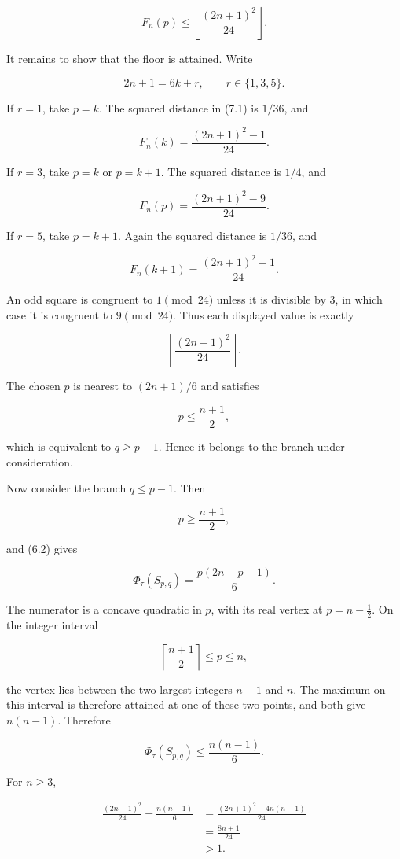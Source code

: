 \documentclass[
  american,
  11pt,
  a4paper,
]{article}
\begin{document}
\[
F_n(p)
\le
\left\lfloor\frac{(2n+1)^2}{24}\right\rfloor.
\]

It remains to show that the floor is attained. Write

\[
2n+1=6k+r,
\qquad
r\in\{1,3,5\}.
\]

If \(r=1\), take \(p=k\). The squared distance in (7.1) is \(1/36\), and

\[
F_n(k)
=
\frac{(2n+1)^2-1}{24}.
\]

If \(r=3\), take \(p=k\) or \(p=k+1\). The squared distance is \(1/4\), and

\[
F_n(p)
=
\frac{(2n+1)^2-9}{24}.
\]

If \(r=5\), take \(p=k+1\). Again the squared distance is \(1/36\), and

\[
F_n(k+1)
=
\frac{(2n+1)^2-1}{24}.
\]

An odd square is congruent to \(1\pmod{24}\) unless it is divisible by \(3\), in which case it is congruent to \(9\pmod{24}\). Thus each displayed value is exactly

\[
\left\lfloor\frac{(2n+1)^2}{24}\right\rfloor.
\]

The chosen \(p\) is nearest to \((2n+1)/6\) and satisfies

\[
p\le\frac{n+1}{2},
\]

which is equivalent to \(q\ge p-1\). Hence it belongs to the branch under consideration.

Now consider the branch \(q\le p-1\). Then

\[
p\ge\frac{n+1}{2},
\]

and (6.2) gives

\[
\Phi_\tau(S_{p,q})
=
\frac{p(2n-p-1)}6.
\]

The numerator is a concave quadratic in \(p\), with its real vertex at \(p=n-\tfrac12\). On the integer interval

\[
\left\lceil\frac{n+1}{2}\right\rceil
\le p\le n,
\]

the vertex lies between the two largest integers \(n-1\) and \(n\). The maximum on this interval is therefore attained at one of these two points, and both give \(n(n-1)\). Therefore

\[
\Phi_\tau(S_{p,q})
\le
\frac{n(n-1)}6.
\]

For \(n\ge3\),

\[
\begin{aligned}
\frac{(2n+1)^2}{24}
-
\frac{n(n-1)}6
&=
\frac{(2n+1)^2-4n(n-1)}{24}\\
&=
\frac{8n+1}{24}\\
&>1.
\end{aligned}
\]
\end{document}
